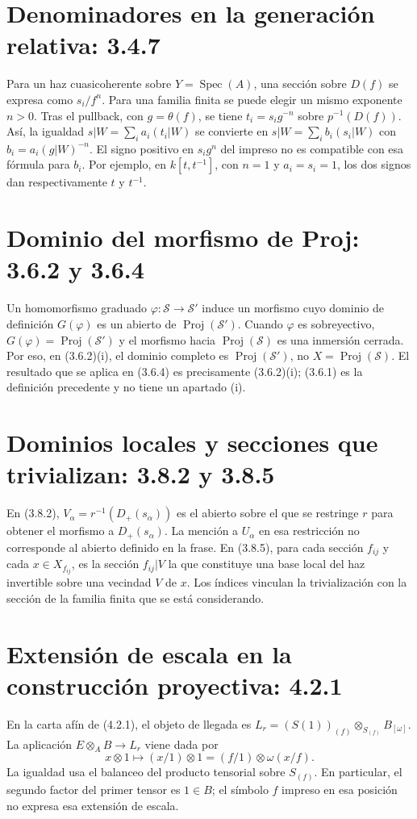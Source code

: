 \documentclass[11pt,a4paper]{article}
\DeclareMathOperator{\Spec}{Spec}
\DeclareMathOperator{\Proj}{Proj}
\begin{document}
\section{Denominadores en la generación relativa: 3.4.7}
Para un haz cuasicoherente sobre $Y=\Spec(A)$, una sección sobre
$D(f)$ se expresa como $s_i/f^n$. Para una familia finita se puede
elegir un mismo exponente $n>0$. Tras el pullback, con $g=\theta(f)$,
se tiene $t_i=s_i g^{-n}$ sobre $p^{-1}(D(f))$.
Así, la igualdad $s|W=\sum_i a_i(t_i|W)$ se convierte en
$s|W=\sum_i b_i(s_i|W)$ con $b_i=a_i(g|W)^{-n}$.
El signo positivo en $s_i g^n$ del impreso no es compatible con
esa fórmula para $b_i$. Por ejemplo, en $k[t,t^{-1}]$, con $n=1$
y $a_i=s_i=1$, los dos signos dan respectivamente $t$ y $t^{-1}$.

\section{Dominio del morfismo de Proj: 3.6.2 y 3.6.4}
Un homomorfismo graduado $\varphi:\mathcal S\to\mathcal S'$
induce un morfismo cuyo dominio de definición $G(\varphi)$ es un
abierto de $\Proj(\mathcal S')$. Cuando $\varphi$ es sobreyectivo,
$G(\varphi)=\Proj(\mathcal S')$ y el morfismo hacia
$\Proj(\mathcal S)$ es una inmersión cerrada. Por eso, en (3.6.2)(i),
el dominio completo es $\Proj(\mathcal S')$, no $X=\Proj(\mathcal S)$.
El resultado que se aplica en (3.6.4) es precisamente (3.6.2)(i);
(3.6.1) es la definición precedente y no tiene un apartado (i).

\section{Dominios locales y secciones que trivializan: 3.8.2 y 3.8.5}
En (3.8.2), $V_\alpha=r^{-1}(D_+(s_\alpha))$ es el abierto sobre
el que se restringe $r$ para obtener el morfismo a $D_+(s_\alpha)$.
La mención a $U_\alpha$ en esa restricción no corresponde al abierto
definido en la frase. En (3.8.5), para cada sección $f_{ij}$ y cada
$x\in X_{f_{ij}}$, es la sección $f_{ij}|V$ la que constituye una
base local del haz invertible sobre una vecindad $V$ de $x$.
Los índices vinculan la trivialización con la sección de la familia
finita que se está considerando.

\section{Extensión de escala en la construcción proyectiva: 4.2.1}
En la carta afín de (4.2.1), el objeto de llegada es
$L_r=(S(1))_{(f)}\otimes_{S_{(f)}}B_{[\omega]}$.
La aplicación $E\otimes_A B\to L_r$ viene dada por
\[
x\otimes1\longmapsto (x/1)\otimes1
                 =(f/1)\otimes\omega(x/f).
\]
La igualdad usa el balanceo del producto tensorial sobre $S_{(f)}$.
En particular, el segundo factor del primer tensor es $1\in B$;
el símbolo $f$ impreso en esa posición no expresa esa extensión
de escala.
\end{document}
